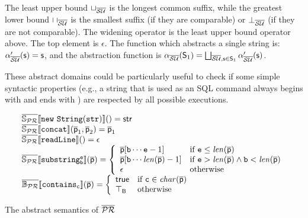 \documentclass[orivec]{llncs}
\begin{document}
The least upper bound $\sqcup_{\mathsf{\overline{\mathsf{\mathcal{SU}}}}}$ is the longest common suffix, while the greatest lower bound $\sqcap_{\mathsf{\overline{\mathsf{\mathcal{SU}}}}}$ is the smallest suffix (if they are comparable) or $\bot_{\mathsf{\overline{\mathsf{\mathcal{SU}}}}}$ (if they are not comparable). The widening operator is the least upper bound operator above. The top element is $\epsilon$. The function which abstracts a single string is: $\alpha_{\mathsf{\overline{\mathsf{\mathcal{SU}}}}}^\prime(\mathsf{s}) = \mathsf{s}$, and the abstraction function is $\alpha_{\mathsf{\overline{\mathsf{\mathcal{SU}}}}}(\mathsf{S}_1) = \bigsqcup_{\mathsf{\overline{\mathsf{\mathcal{SU}}}}, \mathsf{s} \in \mathsf{S}_1}{\alpha_{\mathsf{\overline{\mathsf{\mathcal{SU}}}}}^\prime(\mathsf{s})}$. 

These abstract domains could be particularly useful to check if some simple syntactic properties (e.g., a string that is used as an SQL command always begins with  and ends with ) are respected by all possible executions.

\begin{table}[t]
\footnotesize
\[
\begin{array}{l}
\mathbb{\overline{\mathit{\mathbb{S_{\mathsf{\mathcal{PR}}}}}}}\llbracket \mathtt{\mathtt{new\ String(str)}} \rrbracket() = \mathsf{str} \\
\mathbb{\overline{\mathit{\mathbb{S_{\mathsf{\mathcal{PR}}}}}}}\llbracket \mathtt{\mathtt{concat}} \rrbracket(\mathsf{\overline{p}}_1, \mathsf{\overline{p}}_2) = \mathsf{\overline{p}}_1 \\
\mathbb{\overline{\mathit{\mathbb{S_{\mathsf{\mathcal{PR}}}}}}}\llbracket \mathtt{\mathtt{readLine}} \rrbracket() = \mathsf{\epsilon} \\
\mathbb{\overline{\mathit{\mathbb{S_{\mathsf{\mathcal{PR}}}}}}}\llbracket \mathtt{\mathtt{substring_b^e}} \rrbracket(\mathsf{\overline{p}}) = 
\left\{ 
\begin{array}{ll} 
\mathsf{\overline{p}}[\mathtt{b} \cdots \mathtt{e}-1] & \mbox{if } \mathtt{e} \le \mathit{len}(\mathsf{\overline{p}})\\ 
\mathsf{\overline{p}}[\mathtt{b} \cdots \mathit{len}(\mathsf{\overline{p}})-1] & \mbox{if } \mathtt{e} > \mathit{len}(\mathsf{\overline{p}}) \land \mathtt{b} < \mathit{len}(\mathsf{\overline{p}})\\
\mathsf{\epsilon} & \mbox{otherwise}
\end{array}\right.\\
\mathbb{\overline{\mathit{\mathbb{B_{\mathsf{\mathcal{PR}}}}}}}\llbracket \mathtt{\mathtt{contains_c}} \rrbracket(\mathsf{\overline{p}}) = \left\{ 
\begin{array}{ll}
\mathsf{true} & \mbox{if } \mathtt{c} \in \mathit{char}(\mathsf{\overline{p}})\\
\mathsf{\top_B} & \mbox{otherwise}
\end{array}\right.
\end{array}
\]
 
\caption{The abstract semantics of $\mathsf{\overline{\mathsf{\mathcal{PR}}}}$}
\label{tab:prefixsemantics}
\end{table}
\end{document}
